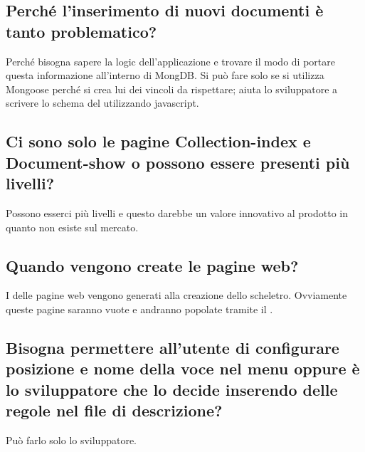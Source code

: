 \subsection{Perché l'inserimento di nuovi documenti è tanto problematico?}
Perché bisogna sapere la  logic dell'applicazione e trovare il modo di portare questa informazione all'interno di MongDB. Si può fare solo se si utilizza Mongoose perché si crea lui dei vincoli da rispettare; aiuta lo sviluppatore a scrivere lo schema del  utilizzando javascript.

\subsection{Ci sono solo le pagine Collection-index e Document-show o possono essere presenti più livelli?}
Possono esserci più livelli e questo darebbe un valore innovativo al prodotto in quanto non esiste sul mercato.

\subsection{Quando vengono create le pagine web?}
I  delle pagine web vengono generati alla creazione dello scheletro. Ovviamente queste pagine saranno vuote e andranno popolate tramite il .

\subsection{Bisogna permettere all'utente di configurare posizione e nome della voce nel menu oppure è lo sviluppatore che lo decide inserendo delle regole nel file di descrizione?}
Può farlo solo lo sviluppatore.



